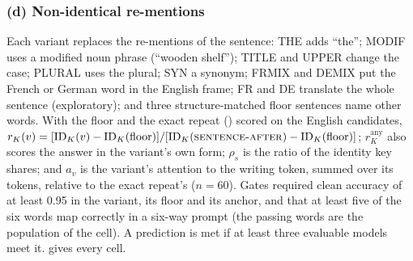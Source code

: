 \subsubsection{(d) Non-identical re-mentions}\label{app:g-forms}

Each variant replaces the re-mentions of the \fmtPost{} sentence: THE adds ``the''; MODIF uses a modified noun phrase (``wooden shelf''); TITLE and UPPER change the case; PLURAL uses the plural; SYN a synonym; FRMIX and DEMIX put the French or German word in the English frame; FR and DE translate the whole sentence (exploratory); and three structure-matched floor sentences name other words. With the floor and the exact repeat (\fmtPost{}) scored on the English candidates, $r_K(v) = [\mathrm{ID}_K(v) - \mathrm{ID}_K(\text{floor})]/[\mathrm{ID}_K(\text{\textsc{sentence-after}{}}) - \mathrm{ID}_K(\text{floor})]$; $r_K^{\mathrm{any}}$ also scores the answer in the variant's own form; $\rho_s$ is the ratio of the identity key shares; and $a_v$ is the variant's attention to the writing token, summed over its tokens, relative to the exact repeat's ($n = 60$). Gates required clean accuracy of at least 0.95 in the variant, its floor and its anchor, and that at least five of the six words map correctly in a six-way prompt (the passing words are the population of the cell). A prediction is met if at least three evaluable models meet it.  gives every cell.

\begin{table}[!ht]
\centering
\caption{\textbf{Non-identical re-mentions} (preregistration G, part (d)). $r_K$: key identity relative to an exact repeat, above a structure-matched floor, on the English candidates; $r_K^{\mathrm{any}}$: the same with the answer also scored in the variant's own form; $a_v$: attention of the re-mention to the writing token relative to the exact repeat, summed over the re-mention's tokens ($n = 60$). $n = 150$ cores per cell before the per-word competence gate; DEMIX and DE cover fewer cores. THE, MODIF, TITLE, UPPER, PLURAL, SYN, FRMIX and DEMIX enter G13--G16; FR, DE and the list variant are exploratory.}
\label{tab:variants}
\resizebox{\textwidth}{!}{}
\end{table}

